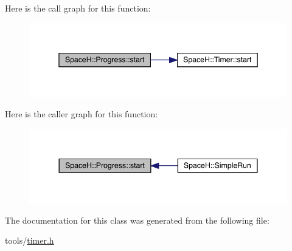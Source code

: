 Here is the call graph for this function\+:
\nopagebreak
\begin{figure}[H]
\begin{center}
\leavevmode
\includegraphics[width=345pt]{class_space_h_1_1_progress_ad8537bcca9928ac45c2ce4f89645e681_cgraph}
\end{center}
\end{figure}
Here is the caller graph for this function\+:
\nopagebreak
\begin{figure}[H]
\begin{center}
\leavevmode
\includegraphics[width=344pt]{class_space_h_1_1_progress_ad8537bcca9928ac45c2ce4f89645e681_icgraph}
\end{center}
\end{figure}


The documentation for this class was generated from the following file\+:\begin{DoxyCompactItemize}
\item 
tools/\mbox{\hyperlink{timer_8h}{timer.\+h}}\end{DoxyCompactItemize}
